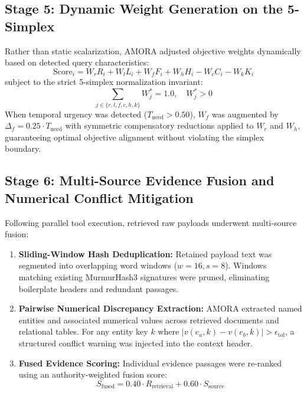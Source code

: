\documentclass[conference,onecolumn,10pt]{IEEEtran}
\begin{document}
\subsection{Stage 5: Dynamic Weight Generation on the 5-Simplex}
\label{subsec:stage5_weights}
Rather than static scalarization, AMORA adjusted objective weights dynamically based on detected query characteristics:
\begin{equation}
    \text{Score}_i = W_r R_i + W_l L_i + W_f F_i + W_h H_i - W_c C_i - W_k K_i
\end{equation}
subject to the strict 5-simplex normalization invariant:
\begin{equation}
    \sum_{j \in \{r, l, f, c, h, k\}} W_j^* = 1.0, \quad W_j^* > 0
\end{equation}
When temporal urgency was detected ($T_{\text{need}} > 0.50$), $W_f$ was augmented by $\Delta_f = 0.25 \cdot T_{\text{need}}$ with symmetric compensatory reductions applied to $W_r$ and $W_h$, guaranteeing optimal objective alignment without violating the simplex boundary.

\subsection{Stage 6: Multi-Source Evidence Fusion and Numerical Conflict Mitigation}
\label{subsec:stage6_fusion}
Following parallel tool execution, retrieved raw payloads underwent multi-source fusion:
\begin{enumerate}
    \item \textbf{Sliding-Window Hash Deduplication:} Retained payload text was segmented into overlapping word windows ($w = 16, s = 8$). Windows matching existing MurmurHash3 signatures were pruned, eliminating boilerplate headers and redundant passages.
    \item \textbf{Pairwise Numerical Discrepancy Extraction:} AMORA extracted named entities and associated numerical values across retrieved documents and relational tables. For any entity key $k$ where $|v(e_a, k) - v(e_b, k)| > \epsilon_{\text{tol}}$, a structured conflict warning was injected into the context header.
    \item \textbf{Fused Evidence Scoring:} Individual evidence passages were re-ranked using an authority-weighted fusion score:
    \begin{equation}
        S_{\text{fused}} = 0.40 \cdot R_{\text{retrieval}} + 0.60 \cdot S_{\text{source}}
    \end{equation}
\end{enumerate}
\end{document}
